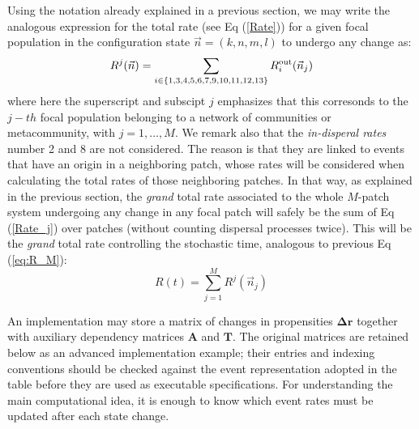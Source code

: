 Using the notation already explained in a previous section, we may write the analogous expression for the total rate (see Eq (\ref{Rate})) for a given focal population in the configuration state $\vec{n}=(k,n,m,l)$ to undergo any change as:
\begin{equation}
R^j(\vec{n}) = \sum_{i\in\{1,3,4,5,6,7,9,10,11,12,13\}} R^{\textup{out}}_i(\vec{n}_j)
\label{Rate_j}
\end{equation}
where here the superscript and subscipt $j$ emphasizes that this corresonds to the $j-th$ focal population belonging to a network of communities or metacommunity, with $j=1, \dots, M$. We remark also that the {\em in-disperal rates} number 2 and 8 are not considered. The reason is that they are linked to events that have an origin in a neighboring patch, whose rates will be considered when calculating the total rates of those neighboring patches. In that way, as explained in the previous section, the {\em grand} total rate associated to the whole $M$-patch system undergoing any change in any focal patch will safely be the sum of Eq (\ref{Rate_j}) over patches (without counting dispersal processes twice). This will be the {\em grand} total rate controlling the stochastic time, analogous to previous Eq (\ref{eq:R_M}):
\begin{equation}
  R(t) =  \sum_{j=1}^{M} R^j(\vec{n}_j)
  \label{eq:RD_M}
\end{equation}  
 
An implementation may store a matrix of changes in propensities $\mathbf{\Delta r}$ together with auxiliary dependency matrices $\mathbf A$ and $\mathbf T$. The original matrices are retained below as an advanced implementation example; their entries and indexing conventions should be checked against the event representation adopted in the table before they are used as executable specifications. For understanding the main computational idea, it is enough to know which event rates must be updated after each state change.  

